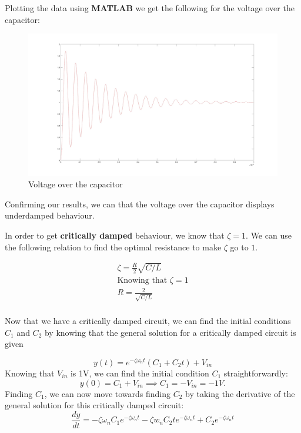 Plotting the data using {\bf MATLAB} we get the following for the voltage over the capacitor:

\begin{figure}[H]
    \centering
    \includegraphics[width=\linewidth]{images/evaluation_vc.jpg}
    \caption{Voltage over the capacitor}
    \label{fig:evaluation_vc}
\end{figure}
Confirming our results, we can that the voltage over the capacitor displays underdamped behaviour.

In order to get {\bf critically damped} behaviour, we know that $\zeta = 1$. We can use the following relation to find the optimal resistance to make $\zeta$ go to $1$.

\begin{equation}
    \begin{gathered}
        \zeta = \frac{R}{2} \sqrt{C/L} \\
        \text{Knowing that $\zeta = 1$} \\
        R = \frac{2}{\sqrt{C/L}} \\
    \end{gathered}
\end{equation}

Now that we have a critically damped circuit, we can find the initial
conditions $C_1$ and $C_2$ by knowing that the general solution
for a critically damped circuit is given

\begin{equation}
    y(t) = e^{-\zeta \omega_n t}\left(C_1 + C_2 t\right) + V_{in}
\end{equation}
Knowing that $V_{in}$ is 1V, we can find the initial condition $C_1$ straightforwardly:
\begin{equation}
    y(0) = C_1 + V_{in} \implies C_1 = -V_{in} = -1V.
\end{equation}
Finding $C_1$, we can now move towards finding $C_2$ by taking the derivative
of the general solution for this critically damped circuit:
\begin{equation}
    \frac{dy}{dt} = -\zeta \omega_n C_1 e^{-\zeta \omega_n t} - \zeta w_n C_2 t e^{-\zeta \omega_n t} + C_2 e^{-\zeta \omega_n t}
\end{equation}

